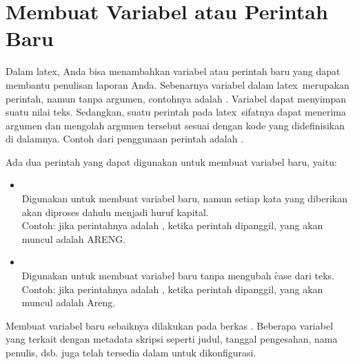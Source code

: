 \section{Membuat Variabel atau Perintah Baru}
\label{sec:newCommand}
Dalam \gls{latex}, Anda bisa menambahkan variabel atau perintah baru yang dapat membantu penulisan laporan Anda.
Sebenarnya variabel dalam \gls{latex}~merupakan perintah, namun tanpa argumen, contohnya adalah .
Variabel dapat menyimpan suatu nilai teks.
Sedangkan, suatu perintah pada \gls{latex}~sifatnya dapat menerima argumen dan mengolah argumen tersebut sesuai dengan kode yang didefinisikan di dalamnya.
Contoh dari penggunaan perintah adalah .

Ada dua perintah yang dapat digunakan untuk membuat variabel baru, yaitu:
\begin{itemize}
	\item {} \\
	Digunakan untuk membuat variabel baru, namun setiap kata yang diberikan akan diproses dahulu menjadi huruf kapital. \\
	Contoh: jika perintahnya adalah , ketika perintah  dipanggil, yang akan muncul adalah ARENG.
	\item {} \\
	Digunakan untuk membuat variabel baru tanpa mengubah \f{case} dari teks. \\
	Contoh: jika perintahnya adalah , ketika perintah  dipanggil, yang akan muncul adalah Areng.
\end{itemize}

Membuat variabel baru sebaiknya dilakukan pada berkas .
Beberapa variabel yang terkait dengan metadata skripsi seperti judul, tanggal pengesahan, nama penulis, dsb. juga telah tersedia dalam  untuk dikonfigurasi.


